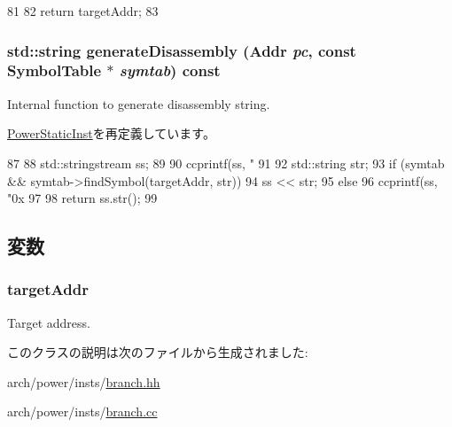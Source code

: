 \begin{DoxyCode}
81 {
82     return targetAddr;
83 }
\end{DoxyCode}
\hypertarget{classPowerISA_1_1BranchNonPCRel_a95d323a22a5f07e14d6b4c9385a91896}{
\subsubsection[{generateDisassembly}]{\setlength{\rightskip}{0pt plus 5cm}std::string generateDisassembly ({\bf Addr} {\em pc}, \/  const SymbolTable $\ast$ {\em symtab}) const}}
\label{classPowerISA_1_1BranchNonPCRel_a95d323a22a5f07e14d6b4c9385a91896}
Internal function to generate disassembly string. 

\hyperlink{classPowerISA_1_1PowerStaticInst_a95d323a22a5f07e14d6b4c9385a91896}{PowerStaticInst}を再定義しています。


\begin{DoxyCode}
87 {
88     std::stringstream ss;
89 
90     ccprintf(ss, "%
91 
92     std::string str;
93     if (symtab && symtab->findSymbol(targetAddr, str))
94         ss << str;
95     else
96         ccprintf(ss, "0x%
97 
98     return ss.str();
99 }
\end{DoxyCode}


\subsection{変数}
\hypertarget{classPowerISA_1_1BranchNonPCRel_af2e4ceec51be67b8f833e5e205e11ca7}{
\subsubsection[{targetAddr}]{ {\bf targetAddr}}}
\label{classPowerISA_1_1BranchNonPCRel_af2e4ceec51be67b8f833e5e205e11ca7}


Target address. 

このクラスの説明は次のファイルから生成されました:\begin{DoxyCompactItemize}
\item 
arch/power/insts/\hyperlink{power_2insts_2branch_8hh}{branch.hh}\item 
arch/power/insts/\hyperlink{branch_8cc}{branch.cc}\end{DoxyCompactItemize}
